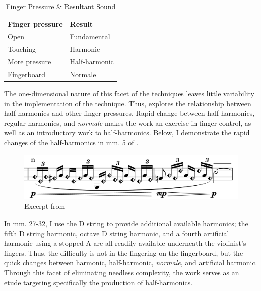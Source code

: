 \begin{table}[]
    \centering
    \caption{Finger Pressure \& Resultant Sound}
    \label{tab:finger-pressure}
    \begin{tabular}{@{}ll@{}}
    \toprule
    Finger pressure & Result        \\ \midrule
    Open            & Fundamental   \\
    Touching        & Harmonic      \\
    More pressure   & Half-harmonic \\
    Fingerboard     & Normale       \\ \bottomrule
    \end{tabular}%
    \end{table}

The one-dimensional nature of this facet of the techniques leaves little variability in the implementation of the technique. 
Thus, \violinPiece explores the relationship between half-harmonics and other finger pressures. 
Rapid change between half-harmonics, regular harmonics, and \emph{normale} makes the work an exercise in finger control, as well as an introductory work to half-harmonics.
Below, I demonstrate the rapid changes of the half-harmonics in mm. 5 of \violinPiece.

\begin{figure}
    \includegraphics[width=\linewidth]{./resources/violinHalfHarmonicsExcerpt5.pdf}
    \caption{Excerpt from \violinPiece}
  \label{fig:Excerpt from what are you doing with the humans, mm. 5}
  \end{figure}

In mm. 27-32, I use the D string to provide additional available harmonics; the fifth D string harmonic, octave D string harmonic, and a fourth artificial harmonic using a stopped A are all readily available underneath the violinist's fingers.
Thus, the difficulty is not in the fingering on the fingerboard, but the quick changes between harmonic, half-harmonic, \emph{normale}, and artificial harmonic.
Through this facet of eliminating needless complexity, the work serves as an etude targeting specifically the production of half-harmonics.

